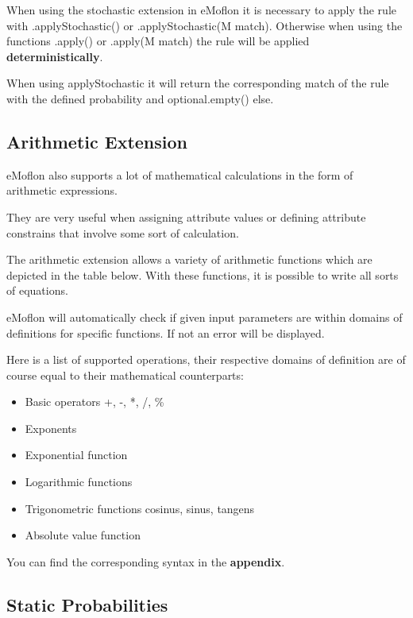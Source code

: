 When using the stochastic extension in eMoflon it is necessary to apply the rule with \textsf{.applyStochastic()} or \textsf{.applyStochastic(M match)}. Otherwise when using the functions \textsf{.apply()} or \textsf{.apply(M match)} the rule will be applied \textbf{deterministically}.

When using \textsf{applyStochastic} it will return the corresponding match of the rule with the defined probability and \textsf{optional.empty()} else.

\subsection{Arithmetic Extension}

eMoflon also supports a lot of mathematical calculations in the form of arithmetic expressions.

They are very useful when assigning attribute values or defining attribute constrains that involve some sort of calculation.\newline

The arithmetic extension allows a variety of arithmetic functions which are depicted in the table below. With these functions, it is possible to write all sorts of equations.

eMoflon will automatically check if given input parameters are within domains of definitions for specific functions. If not an error will be displayed.\newline

Here is a list of supported operations, their respective domains of definition are of course equal to their mathematical counterparts:

\begin{itemize}
    \item Basic operators +, -, *, /, \%
    
    \item Exponents
    
    \item Exponential function
    \item Logarithmic functions
    \item Trigonometric functions cosinus, sinus, tangens
    \item Absolute value function
\end{itemize}

You can find the corresponding syntax in the \textbf{appendix}.\newline

\subsection{Static Probabilities}

